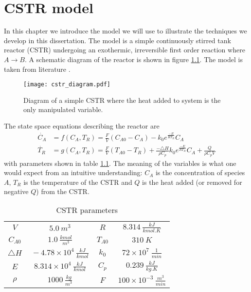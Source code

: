 \chapter{CSTR model}
\label{sec_cstr}
In this chapter we introduce the model we will use to illustrate the techniques we develop in this dissertation. The model is a simple continuously stirred tank reactor (CSTR) undergoing an exothermic, irreversible first order reaction where $A \rightarrow B$. A schematic diagram of the reactor is shown in figure \ref{fig_cstr_diagram}. The model is taken from literature \cite{cstrmodel}.
\begin{figure}[H] 
\centering
\texttt{[image: cstr\_diagram.pdf]}
\caption{Diagram of a simple CSTR where the heat added to system is the only manipulated variable.}
\label{fig_cstr_diagram}
\end{figure}
The state space equations describing the reactor are 
\begin{equation}
\begin{aligned}
\dot{C_A} &= f(C_A, T_R) =  \frac{F}{V}\left( C_{A0}-C_A \right) - k_0e^{\frac{-E}{RT_R}}C_A \\
\dot{T_R} &= g(C_A, T_R) = \frac{F}{V}\left(T_{A0}-T_R\right) + \frac{-\triangle H}{\rho C_p}k_0e^{\frac{-E}{RT_R}}C_A + \frac{Q}{\rho C_p V}
\end{aligned}
\label{eq_cstrmodel}
\end{equation}
with parameters shown in table \ref{tab_params}. The meaning of the variables is what one would expect from an intuitive understanding: $C_A$ is the concentration of species $A$, $T_R$ is the temperature of the CSTR and $Q$ is the heat added (or removed for negative $Q$) from the CSTR.
\begin{table}[H]
\begin{center}
\begin{tabular}{c c c c}
\hline
$V$ & $~5.0~m^3$ & $R$ & $~8.314~\frac{kJ}{kmol.K}$ \\
$C_{A0}$ & $~1.0~\frac{kmol}{m^3}$ &$T_{A0}$ & $~310~K$ \\
$\triangle H$ & $~-4.78\times 10^{4}~\frac{kJ}{kmol}$ & $k_{0}$ & $~72\times 10^{7}~\frac{1}{min}$ \\
$E$ & $~8.314\times 10^4~\frac{kJ}{kmol}$ & $C_{p}$ & $~0.239~\frac{kJ}{kg.K}$ \\
$\rho$ & $~1000~\frac{kg}{m^3}$ & 
$F$ & $~100\times 10^{-3}~\frac{m^3}{min}$ \\
\hline
\end{tabular}
\caption{CSTR parameters}
\label{tab_params}
\end{center}
\end{table}
